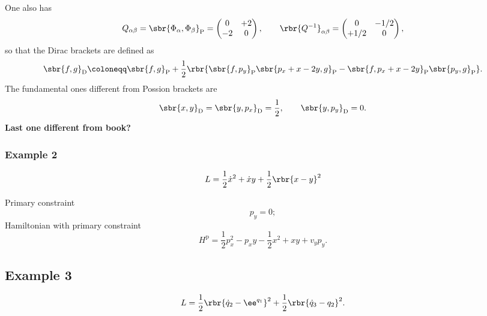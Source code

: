 \documentclass[a4paper,11pt]{article}
\begin{document}
One also has
\begin{equation}
Q_{\alpha\beta} = \sbr{\Phi_\alpha, \Phi_\beta}_\text{P} =
\begin{pmatrix} 0 & +2 \\ -2 & 0 \end{pmatrix},\qquad
\rbr{Q^{-1}}_{\alpha\beta} =
\begin{pmatrix} 0 & -1/2 \\ +1/2 & 0 \end{pmatrix},
\end{equation}
so that the Dirac brackets are defined as
\begin{equation}
\sbr{f,g}_\text{D} \coloneqq \sbr{f,g}_\text{P} + \frac{1}{2}
\rbr{\sbr{f,p_y}_\text{P}\sbr{p_x+x-2y,g}_\text{P}
-\sbr{f,p_x+x-2y}_\text{P}\sbr{p_y,g}_\text{P}}.
\end{equation}
The fundamental ones different from Possion brackets are
\begin{equation}
\sbr{x,y}_\text{D} = \sbr{y,p_x}_\text{D} = \frac{1}{2},\qquad
\sbr{y,p_y}_\text{D} = 0.
\end{equation}
\textbf{Last one different from book?}







\subsubsection*{Example 2}

\begin{equation}
L = \frac{1}{2}\dot{x}^2 + \dot{x} y + \frac{1}{2}\rbr{x-y}^2
\end{equation}

Primary constraint
\begin{equation}
p_y = 0;
\end{equation}
Hamiltonian with primary constraint
\begin{equation}
H^\text{p} = \frac{1}{2}p_x^2 - p_x y - \frac{1}{2} x^2 + xy + v_y p_y.
\end{equation}

\subsection*{Example 3}

\begin{equation}
L = \frac{1}{2} \rbr{\dot{q}_2 - \ee^{q_1}}^2 + \frac{1}{2} \rbr{\dot{q}_3 - 
q_2}^2.
\end{equation}
\end{document}
